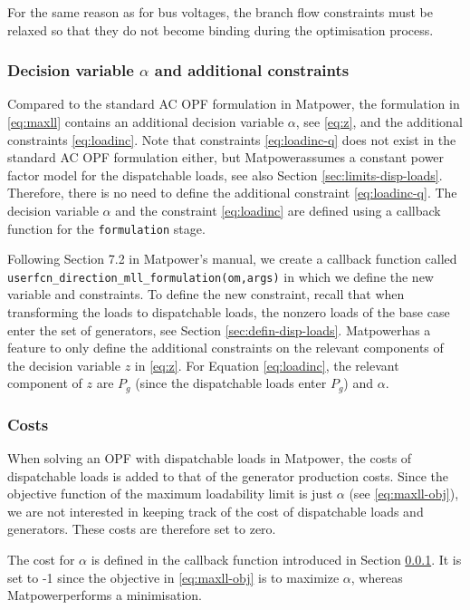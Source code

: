 \documentclass[12pt,a4]{article}
\newcommand*{\codemat}[1]{\texttt{#1}}
\newcommand*{\matpower}{{\sc Matpower}}
\begin{document}
For the same reason as for bus voltages, the branch flow constraints must be relaxed so that they do not become binding during the optimisation process.

\subsubsection{Decision variable $\alpha$ and additional constraints}
\label{sec:defin-vari-alpha}

Compared to the standard AC OPF formulation in \matpower, the formulation in \eqref{eq:maxll} contains an additional decision variable $\alpha$, see \eqref{eq:z}, and the additional constraints \eqref{eq:loadinc}.
Note that constraints \eqref{eq:loadinc-q} does not exist in the standard AC OPF formulation either, but \matpower assumes a constant power factor model for the dispatchable loads, see also Section \ref{sec:limits-disp-loads}.
Therefore, there is no need to define the additional constraint \eqref{eq:loadinc-q}.
The decision variable $\alpha$ and the constraint \eqref{eq:loadinc} are defined using a callback function for the \codemat{formulation} stage.

Following Section 7.2 in \matpower's manual, we create a callback function called \codemat{userfcn\_direction\_mll\_formulation(om,args)} in which we define the new variable and constraints.
To define the new constraint, recall that when transforming the loads to dispatchable loads, the nonzero loads of the base case enter the set of generators, see Section \ref{sec:defin-disp-loads}.
\matpower has a feature to only define the additional constraints on the relevant components of the decision variable $z$ in \eqref{eq:z}.
For Equation \eqref{eq:loadinc}, the relevant component of $z$ are $P_g$ (since the dispatchable loads enter $P_g$) and $\alpha$.

\subsubsection{Costs}
\label{sec:costs}

When solving an OPF with dispatchable loads in \matpower, the costs of dispatchable loads is added to that of the generator production costs.
Since the objective function of the maximum loadability limit is just $\alpha$ (see \eqref{eq:maxll-obj}), we are not interested in keeping track of the cost of dispatchable loads and generators.
These costs are therefore set to zero.

The cost for $\alpha$ is defined in the callback function introduced in Section \ref{sec:defin-vari-alpha}.
It is set to -1 since the objective in \eqref{eq:maxll-obj} is to maximize $\alpha$, whereas \matpower performs a minimisation.
\end{document}
